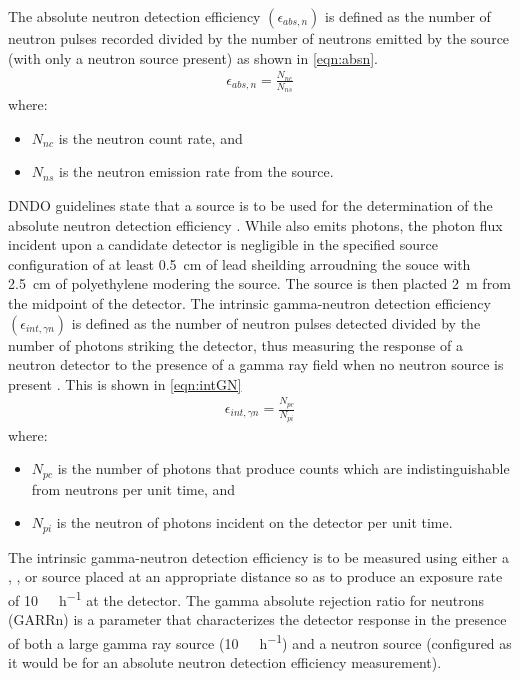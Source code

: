 \documentclass[draftcls,onecolumn]{IEEEtran}
\begin{document}
The absolute neutron detection efficiency $\left (\epsilon_{abs,n} \right )$ is defined as the number of neutron pulses recorded divided by the number of neutrons emitted by the source (with only a neutron source present) as shown in \eqref{eqn:absn}.
\begin{align}
	\label{eqn:absn}
  \epsilon_{abs,n} = \frac{N_{nc}}{N_{ns}}
\end{align}
where:
\begin{itemize}
 \item[] $N_{nc}$ is the neutron count rate, and
 \item[] $N_{ns}$ is the neutron emission rate from the source.
\end{itemize}
DNDO guidelines state that a  source is to be used for the determination of the absolute neutron detection efficiency \cite{pnnl_18471}.
While  also emits photons, the photon flux incident upon a candidate detector is negligible in the specified source configuration of at least \SI{0.5}{\cm} of lead sheilding arroudning the souce with \SI{2.5}{\cm} of polyethylene modering the source.
The source is then placted \SI{2}{\meter} from the midpoint of the detector.
The intrinsic gamma-neutron detection efficiency $\left(\epsilon_{int,\gamma n}\right)$  is defined as the number of neutron pulses detected divided by the number of photons striking the detector, thus measuring the response of a neutron detector to the presence of a gamma ray field when no neutron source is present .
This is shown in \eqref{eqn:intGN}
\begin{align}
  \label{eqn:intGN}
  \epsilon_{int,\gamma n} = \frac{N_{pc}}{N_{pi}}
\end{align}
where:
\begin{itemize}
 \item[] $N_{pc}$ is the number of photons that produce counts which are indistinguishable from neutrons per unit time, and 
 \item[] $N_{pi}$ is the neutron of photons incident on the detector per unit time.
\end{itemize}
The intrinsic gamma-neutron detection efficiency is to be measured using either a , , or  source placed at an appropriate distance so as to produce an exposure rate of \SI{10}{\milli\roetgen\per\hour} at the detector\cite{kouzes_neutron_1999}.
The gamma absolute rejection ratio for neutrons (GARRn) is a parameter that characterizes the detector response in the presence of both a large gamma ray source (\SI{10}{\milli\roetgen\per\hour}) and a  neutron source (configured as it would be for an absolute neutron detection efficiency measurement).
\end{document}
